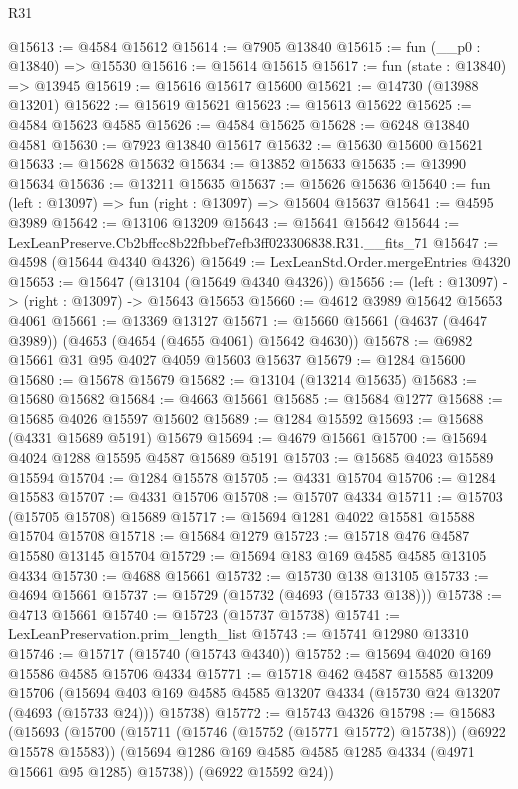 \begin{lexlean}{R31}
\begin{coremodule}
@15613 := @4584 @15612
@15614 := @7905 @13840
@15615 := fun (__p0 : @13840) => @15530
@15616 := @15614 @15615
@15617 := fun (state : @13840) => @13945
@15619 := @15616 @15617 @15600
@15621 := @14730 (@13988 @13201)
@15622 := @15619 @15621
@15623 := @15613 @15622
@15625 := @4584 @15623 @4585
@15626 := @4584 @15625
@15628 := @6248 @13840 @4581
@15630 := @7923 @13840 @15617
@15632 := @15630 @15600 @15621
@15633 := @15628 @15632
@15634 := @13852 @15633
@15635 := @13990 @15634
@15636 := @13211 @15635
@15637 := @15626 @15636
@15640 := fun (left : @13097) => fun (right : @13097) => @15604 @15637
@15641 := @4595 @3989
@15642 := @13106 @13209
@15643 := @15641 @15642
@15644 := LexLeanPreserve.Cb2bffcc8b22fbbef7efb3ff023306838.R31.__fits_71
@15647 := @4598 (@15644 @4340 @4326)
@15649 := LexLeanStd.Order.mergeEntries @4320
@15653 := @15647 (@13104 (@15649 @4340 @4326))
@15656 := (left : @13097) -> (right : @13097) -> @15643 @15653
@15660 := @4612 @3989 @15642 @15653 @4061
@15661 := @13369 @13127
@15671 := @15660 @15661 (@4637 (@4647 @3989)) (@4653 (@4654 (@4655 @4061) @15642 @4630))
@15678 := @6982 @15661 @31 @95 @4027 @4059 @15603 @15637
@15679 := @1284 @15600
@15680 := @15678 @15679
@15682 := @13104 (@13214 @15635)
@15683 := @15680 @15682
@15684 := @4663 @15661
@15685 := @15684 @1277
@15688 := @15685 @4026 @15597 @15602
@15689 := @1284 @15592
@15693 := @15688 (@4331 @15689 @5191) @15679
@15694 := @4679 @15661
@15700 := @15694 @4024 @1288 @15595 @4587 @15689 @5191
@15703 := @15685 @4023 @15589 @15594
@15704 := @1284 @15578
@15705 := @4331 @15704
@15706 := @1284 @15583
@15707 := @4331 @15706
@15708 := @15707 @4334
@15711 := @15703 (@15705 @15708) @15689
@15717 := @15694 @1281 @4022 @15581 @15588 @15704 @15708
@15718 := @15684 @1279
@15723 := @15718 @476 @4587 @15580 @13145 @15704
@15729 := @15694 @183 @169 @4585 @4585 @13105 @4334
@15730 := @4688 @15661
@15732 := @15730 @138 @13105
@15733 := @4694 @15661
@15737 := @15729 (@15732 (@4693 (@15733 @138)))
@15738 := @4713 @15661
@15740 := @15723 (@15737 @15738)
@15741 := LexLeanPreservation.prim_length_list
@15743 := @15741 @12980 @13310
@15746 := @15717 (@15740 (@15743 @4340))
@15752 := @15694 @4020 @169 @15586 @4585 @15706 @4334
@15771 := @15718
    @462
    @4587
    @15585
    @13209
    @15706
    (@15694 @403 @169 @4585 @4585 @13207 @4334 (@15730 @24 @13207 (@4693 (@15733 @24))) @15738)
@15772 := @15743 @4326
@15798 := @15683
    (@15693
      (@15700
        (@15711 (@15746 (@15752 (@15771 @15772) @15738)) (@6922 @15578 @15583))
        (@15694 @1286 @169 @4585 @4585 @1285 @4334 (@4971 @15661 @95 @1285) @15738))
      (@6922 @15592 @24))

\end{coremodule}
\end{lexlean}
